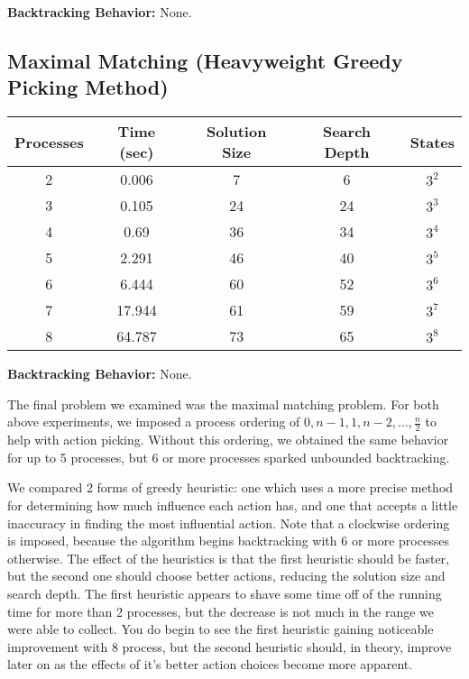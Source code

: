 {\bf Backtracking Behavior:} None.

\subsection{Maximal Matching (Heavyweight Greedy Picking Method)}
\begin{center}
\begin{tabular}{|c|c|c|c|c|}
\hline
 Processes & Time (sec) & Solution Size & Search Depth & States \\
\hline         
 2 & 0.006 & 7 & 6 & $3^{2}$        \\
 3 & 0.105 & 24 & 24 & $3^{3}$       \\
 4 & 0.69 & 36 & 34 & $3^{4}$      \\
 5 & 2.291 & 46 & 40 & $3^{5}$      \\
 6 & 6.444 & 60 & 52 & $3^{6}$     \\
 7 & 17.944 & 61 & 59 & $3^{7}$    \\
 8 & 64.787 & 73 & 65 & $3^{8}$    \\
\hline
\end{tabular}
\end{center}

{\bf Backtracking Behavior:} None.

The final problem we examined was the maximal matching problem.
For both above experiments, we imposed a process ordering of $0,n-1,1,n-2,\dots,\frac{n}{2}$ to help with action picking.
Without this ordering, we obtained the same behavior for up to 5 processes, but 6 or more processes sparked unbounded backtracking.

We compared 2 forms of greedy heuristic:
one which uses a more precise method for determining how much influence each action has, and one that
accepts a little inaccuracy in finding the most influential action.  Note that a clockwise ordering is
imposed, because the algorithm begins backtracking with 6 or more processes otherwise.  The effect of the
heuristics is that the first heuristic should be faster, but the second one should choose better
actions, reducing the solution size and search depth.  The first heuristic appears to shave some time
off of the running time for more than 2 processes, but the decrease is not much in the range we were able
to collect.  You do begin to see the first heuristic gaining noticeable improvement with 8 process, but
the second heuristic should, in theory, improve later on as the effects of it's better action choices
become more apparent.


